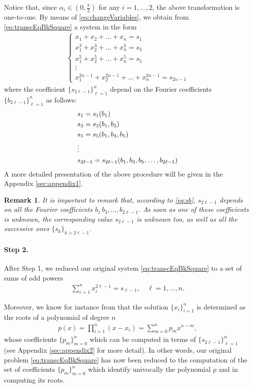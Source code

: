 \documentclass[a4paper]{article}
\numberwithin{equation}{section}
\newtheorem{remark}{Remark}
\begin{document}
Notice that, since $\alpha_i\in (0,\frac \pi2)$ for any $i=1,\ldots,2$, the above transformation is one-to-one. By means of \eqref{eq:changeVariables}, we obtain from \eqref{eq:transcEqBkSquare} a system in the form
\begin{align}\label{eq:algebraicEqBkSquare}
	\begin{cases}
		\displaystyle x_1 + x_2 + \ldots + x_n = s_1
		\\
		\displaystyle x_1^3 + x_2^3 + \ldots + x_n^3 = s_3
		\\
		\displaystyle x_1^5 + x_2^5 + \ldots + x_n^5 = s_5
		\\
		\vdots 
		\\
		\displaystyle x_1^{2n-1} + x_2^{2n-1} + \ldots + x_n^{2n-1} = s_{2n-1}
	\end{cases}	
\end{align}
where the coefficient $\{s_{2\ell-1}\}_{\ell=1}^n$ depend on the Fourier coefficients $\{b_{2\ell-1}\}_{\ell=1}^n$ as follows:
\begin{align}\label{eq:sb}
	&s_1 = s_1(b_1) \notag
	\\
	&s_3 = s_3(b_1,b_3) \notag
	\\
	&s_5 = s_5(b_1,b_3,b_5) \notag
	\\
	&\vdots \notag
	\\
	&s_{2\ell-1} = s_{2\ell-1}(b_1,b_3,b_5,\ldots,b_{2\ell-1})
\end{align}
A more detailed presentation of the above procedure will be given in the Appendix \ref{sec:appendix1}.

\begin{remark}
\em{
It is important to remark that, according to \eqref{eq:sb}, $s_{2\ell-1}$ depends on all the Fourier coefficients $b_1\,b_3,\ldots,b_{2\ell-1}$. As soon as one of these coefficients is unknown, the corresponding value $s_{2\ell-1}$ is unknown too, as well as all the successive ones $\{s_k\}_{k> 2\ell-1}$.
}
\end{remark}

\paragraph{Step 2.}	After Step 1, we reduced our original system \eqref{eq:transcEqBkSquare} to a set of sums of odd powers
\begin{align}\label{eq:sumOdd}
	\sum_{i=1}^n x_i^{2\ell-1} = s_{\ell-1}, \quad \ell = 1,\ldots,n.
\end{align}

Moreover, we know for instance from \cite[Theorem 1]{chudnovsky1999solution} that the solution $\{x_i\}_{i=1}^n$ is determined as the roots of a polynomial of degree $n$
\begin{align*}
	p(x) = \prod_{i=1}^n (x-x_i) = \sum_{m=0}^n p_mx^{n-m},
\end{align*}
whose coefficients $\{p_m\}_{m=0}^n$ which can be computed in terms of $\{s_{2\ell-1}\}_{\ell=1}^n$ (see Appendix \ref{sec:appendix2} for more detail). In other words, our original problem \eqref{eq:transcEqBkSquare} has now been reduced to the computation of the set of coefficients $\{p_m\}_{m=0}^n$ which identify univocally the polynomial $p$ and in computing its roots.
\end{document}
